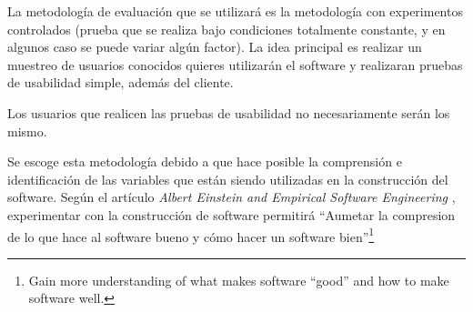 


La metodología de evaluación que se utilizará es la metodología con experimentos controlados (prueba que se realiza bajo condiciones totalmente constante, y en algunos caso se puede variar algún factor). La idea principal es realizar un muestreo de usuarios conocidos quieres utilizarán el software y realizaran pruebas de usabilidad simple, además del cliente. 

Los usuarios que realicen las pruebas de usabilidad no necesariamente serán los mismo.

Se escoge esta metodología debido a que hace posible la comprensión e identificación de las variables que están siendo utilizadas en la construcción del software. Según el artículo \emph{Albert Einstein and Empirical Software Engineering} \cite{8}, experimentar con la construcción de software permitirá ``Aumetar la compresion de lo que hace al software bueno y cómo hacer un software bien''\footnote{Gain more understanding of what makes software ``good'' and how to make software well.}


